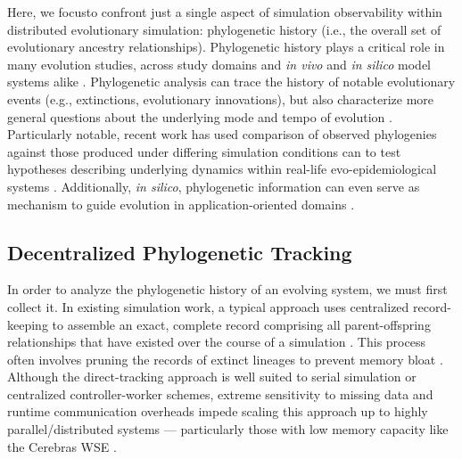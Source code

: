 Here, we focusto confront just a single aspect of simulation observability within distributed evolutionary simulation: phylogenetic history (i.e., the overall set of evolutionary ancestry relationships).
Phylogenetic history plays a critical role in many evolution studies, across study domains and \textit{in vivo} and \textit{in silico} model systems alike \citep{faithConservationEvaluationPhylogenetic1992, STAMATAKIS2005phylogenetics, frenchHostPhylogenyShapes2023,kim2006discovery,TODOCITESOMESIMULATIONPAPERS}.
Phylogenetic analysis can trace the history of notable evolutionary events (e.g., extinctions, evolutionary innovations), but also characterize more general questions about the underlying mode and tempo of evolution \citep{moreno2023toward,hernandez2022can,shahbandegan2022untangling,lewinsohnStatedependentEvolutionaryModels2023a}.
Particularly notable, recent work has used comparison of observed phylogenies against those produced under differing simulation conditions can to test hypotheses describing underlying dynamics within real-life evo-epidemiological systems \citep{giardina2017inference,voznica2022deep}.
Additionally, \textit{in silico}, phylogenetic information can even serve as mechanism to guide evolution in application-oriented domains \citep{lalejini2024phylogeny,lalejini2024runtime,murphy2008simple,burke2003increased}.

\subsection{Decentralized Phylogenetic Tracking}

In order to analyze the phylogenetic history of an evolving system, we must first collect it.
In existing simulation work, a typical approach uses centralized record-keeping to assemble an exact, complete record comprising all parent-offspring relationships that have existed over the course of a simulation \citep{phylotrackandeverythingphylotrackcitedTODO}.
This process often involves pruning the records of extinct lineages to prevent memory bloat \citep{TODOcitepreprint}.
Although the direct-tracking approach is well suited to serial simulation or centralized controller-worker schemes, extreme sensitivity to missing data and runtime communication overheads impede scaling this approach up to highly parallel/distributed systems --- particularly those with low memory capacity like the Cerebras WSE \citep{moreno2024analysis}.

